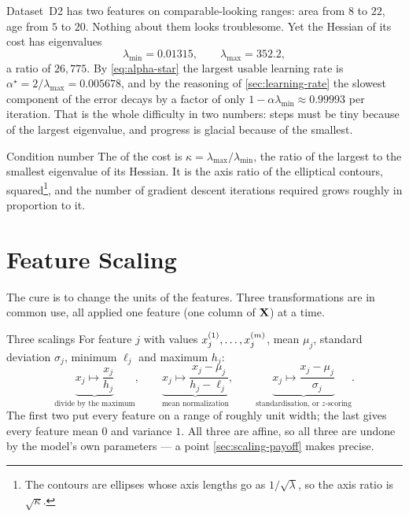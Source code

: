 Dataset~D2 has two features on comparable-looking ranges: area from $8$ to $22$,
age from $5$ to $20$. Nothing about them looks troublesome. Yet the Hessian of
its cost has eigenvalues
\[
  \lambda_{\min} = 0.01315,
  \qquad
  \lambda_{\max} = 352.2,
\]
a ratio of $26{,}775$. By \cref{eq:alpha-star} the largest usable learning rate
is $\alpha^\star = 2/\lambda_{\max} = 0.005678$, and by the reasoning of
\cref{sec:learning-rate} the slowest component of the error decays by a factor
of only $1 - \alpha\lambda_{\min} \approx 0.99993$ per iteration. That is the
whole difficulty in two numbers: steps must be tiny because of the largest
eigenvalue, and progress is glacial because of the smallest.

\begin{defbox}{Condition number}
The  of the cost is
$\kappa = \lambda_{\max}/\lambda_{\min}$, the ratio of the largest to the
smallest eigenvalue of its Hessian. It is the axis ratio of the elliptical
contours, squared\footnote{The contours are ellipses whose axis lengths go as
$1/\sqrt{\lambda}$, so the axis ratio is $\sqrt{\kappa}$.}, and the number of
gradient descent iterations required grows roughly in proportion to it.
\end{defbox}

\section{Feature Scaling}
\label{sec:feature-scaling}

The cure is to change the units of the features. Three transformations are in
common use, all applied one feature (one column of $\mathbf{X}$) at a time.

\begin{defbox}{Three scalings}
For feature $j$ with values $x^{(1)}_{j},\dots,x^{(m)}_{j}$, mean $\mu_j$,
standard deviation $\sigma_j$, minimum $\ell_j$ and maximum $h_j$:
\[
  \underbrace{x_j \mapsto \frac{x_j}{h_j}}_{\text{divide by the maximum}},
  \qquad
  \underbrace{x_j \mapsto \frac{x_j - \mu_j}{h_j - \ell_j}}_{\text{mean normalization}},
  \qquad
  \underbrace{x_j \mapsto \frac{x_j - \mu_j}{\sigma_j}}_{\text{standardisation, or $z$-scoring}} .
\]
The first two put every feature on a range of roughly unit width; the last gives
every feature mean $0$ and variance $1$. All three are affine, so all three are
undone by the model's own parameters --- a point \cref{sec:scaling-payoff}
makes precise.
\end{defbox}

